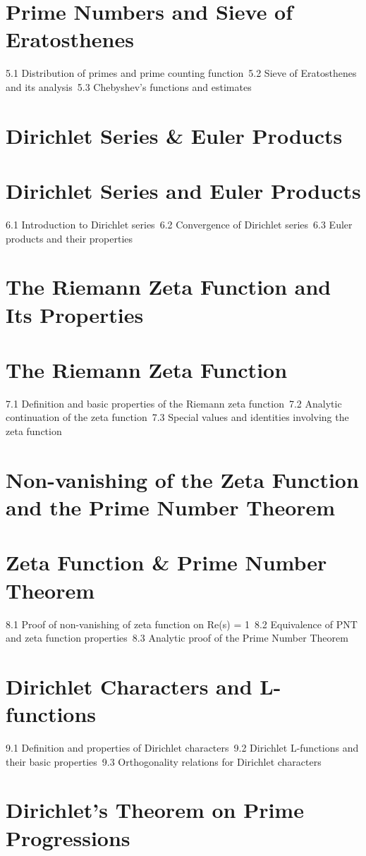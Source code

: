 \section{Prime Numbers and Sieve of Eratosthenes}
5.1 Distribution of primes and prime counting function\
5.2 Sieve of Eratosthenes and its analysis\
5.3 Chebyshev's functions and estimates\
\section{Dirichlet Series \& Euler Products}
\section{Dirichlet Series and Euler Products}
6.1 Introduction to Dirichlet series\
6.2 Convergence of Dirichlet series\
6.3 Euler products and their properties\
\section{The Riemann Zeta Function and Its Properties}
\section{The Riemann Zeta Function}
7.1 Definition and basic properties of the Riemann zeta function\
7.2 Analytic continuation of the zeta function\
7.3 Special values and identities involving the zeta function\
\section{Non-vanishing of the Zeta Function and the Prime Number Theorem}
\section{Zeta Function \& Prime Number Theorem}
8.1 Proof of non-vanishing of zeta function on Re(s) = 1\
8.2 Equivalence of PNT and zeta function properties\
8.3 Analytic proof of the Prime Number Theorem\
\section{Dirichlet Characters and L-functions}
9.1 Definition and properties of Dirichlet characters\
9.2 Dirichlet L-functions and their basic properties\
9.3 Orthogonality relations for Dirichlet characters\
\section{Dirichlet's Theorem on Prime Progressions}
